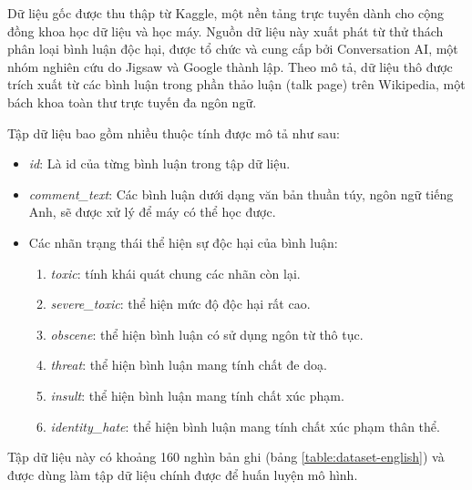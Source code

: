 Dữ liệu gốc được thu thập từ Kaggle, một nền tảng trực tuyến dành cho cộng đồng khoa học dữ liệu và học máy. Nguồn dữ liệu này xuất phát từ thử thách phân loại bình luận độc hại, được tổ chức và cung cấp bởi Conversation AI, một nhóm nghiên cứu do Jigsaw và Google thành lập. Theo mô tả, dữ liệu thô được trích xuất từ các bình luận trong phần thảo luận (talk page) trên Wikipedia, một bách khoa toàn thư trực tuyến đa ngôn ngữ.

Tập dữ liệu bao gồm nhiều thuộc tính được mô tả như sau:
\begin{itemize}
    \item \textit{id}: Là id của từng bình luận trong tập dữ liệu.
    \item \textit{comment\_text}: Các bình luận dưới dạng văn bản thuần túy, ngôn ngữ tiếng Anh, sẽ được xử lý để máy có thể học được.
    \item Các nhãn trạng thái thể hiện sự độc hại của bình luận:
          \begin{enumerate}
              \item \textit{toxic}: tính khái quát chung các nhãn còn lại.
              \item \textit{severe\_toxic}: thể hiện mức độ độc hại rất cao.
              \item \textit{obscene}: thể hiện bình luận có sử dụng ngôn từ thô tục.
              \item \textit{threat}: thể hiện bình luận mang tính chất đe doạ.
              \item \textit{insult}: thể hiện bình luận mang tính chất xúc phạm.
              \item \textit{identity\_hate}: thể hiện bình luận mang tính chất xúc phạm thân thể.
          \end{enumerate}
\end{itemize}

Tập dữ liệu này có khoảng 160 nghìn bản ghi (bảng \ref{table:dataset-english}) và được dùng làm tập dữ liệu chính được để huấn luyện mô hình.
